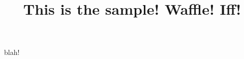 \documentclass{ximera}
\title{This is the sample! Waffle!  Iff!}
\begin{document}
\begin{abstract}
  
\end{abstract}
\maketitle

blah!
\end{document}
